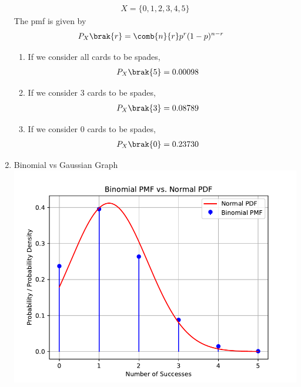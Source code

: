 \documentclass[journal,12pt,twocolumn]{IEEEtran}
\theoremstyle{remark}
\begin{document}
\begin{enumerate}[label=(\roman*)]
\begin{align}
X = \{0,1,2,3,4,5\}
\end{align}
The pmf is given by 
\begin{align} 
P_X\brak{r} &= \comb{n}{r} p^{r}(1-p)^{n-r}
\end{align}
\begin{enumerate}[label=(\alph*)]
\item If we consider all cards to be spades, 
\begin{align}
P_X\brak{5} &= 0.00098
\end{align}
\item If we consider 3 cards to be spades, 
\begin{align}
P_X\brak{3} &= 0.08789
\end{align}
\item If we consider 0 cards to be spades, 
\begin{align}
P_X\brak{0} &= 0.23730
\end{align}
\end{enumerate}
\item Binomial vs Gaussian Graph\\
\includegraphics[width=\columnwidth]{./figs/plot.pdf}
\end{enumerate}
\end{document}
